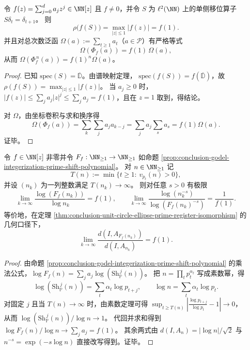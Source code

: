 \begin{proposition}[谱半径与总次数放大因子]\label{prop:conclusion-polynomial-algorithm-spectral-radius-mass}
令 \(f(z)=\sum_{j=0}^d a_j z^j\in\NN[z]\) 且 \(f\neq 0\)，并令 \(S\) 为 \(\ell^2(\NN)\) 上的单侧移位算子 \(S\delta_t=\delta_{t+1}\)。
则
\[
\rho\!\bigl(f(S)\bigr)=\max_{|z|\le 1}|f(z)|=f(1).
\]
并且对总次数泛函 \(\Omega(a):=\sum_{t\ge 1}a_t\)（\(a\in\mathcal P\)）有严格等式
\[
\Omega(\Phi_f(a))=f(1)\,\Omega(a),
\]
从而 \(\Omega(\Phi_f^{\,n}(a))=f(1)^n\Omega(a)\)。
\end{proposition}
\begin{proof}
已知 \(\mathrm{spec}(S)=\overline{\mathbb D}\)。由谱映射定理，
\(
\mathrm{spec}(f(S))=f(\overline{\mathbb D})
\)，故
\(
\rho(f(S))=\max_{|z|\le 1}|f(z)|
\)。
当 \(a_j\ge 0\) 时，\(|f(z)|\le \sum_j a_j|z|^j\le \sum_j a_j=f(1)\)，且在 \(z=1\) 取到，得结论。
\par
对 \(\Omega\)，由坐标卷积与求和换序得
\[
\Omega(\Phi_f(a))
=\sum_k\sum_j a_j a_{k-j}
=\sum_j a_j\sum_s a_s
=f(1)\Omega(a).
\]
证毕。
\end{proof}

\begin{proposition}[高素数端的椭圆重整化指数]\label{prop:conclusion-prime-shift-ellipse-renormalization-exponent}
令 \(f\in\NN[z]\) 非零并令 \(F_f:\NN_{\ge 1}\to\NN_{\ge 1}\) 如命题 \ref{prop:conclusion-godel-integerization-prime-shift-polynomial}。
对 \(n\in\NN_{\ge 1}\) 记
\[
T(n):=\min\{t\ge 1:\ v_{p_t}(n)>0\},
\]
并设 \((n_k)\) 为一列整数满足 \(T(n_k)\to\infty\)。
则对任意 \(s>0\) 有极限
\[
\lim_{k\to\infty}\frac{\log (F_f(n_k))}{\log n_k}=f(1),
\qquad
\lim_{k\to\infty}\frac{\log(n_k^{-s})}{\log(F_f(n_k)^{-s})}=\frac{1}{f(1)}.
\]
等价地，在定理 \ref{thm:conclusion-unit-circle-ellipse-prime-register-isomorphism} 的几何口径下，
\[
\lim_{k\to\infty}\frac{d(I,A_{F_f(n_k)})}{d(I,A_{n_k})}=f(1).
\]
\end{proposition}
\begin{proof}
由命题 \ref{prop:conclusion-godel-integerization-prime-shift-polynomial} 的乘法公式，\(\log F_f(n)=\sum_j a_j\log(\mathrm{Sh}_{\mathbb P}^{\,j}(n))\)。
把 \(n=\prod_t p_t^{\alpha_t}\) 写成素数幂，得
\[
\log(\mathrm{Sh}_{\mathbb P}^{\,j}(n))=\sum_t \alpha_t\log p_{t+j},
\qquad
\log n=\sum_t \alpha_t\log p_t.
\]
对固定 \(j\) 且当 \(T(n)\to\infty\) 时，由素数定理可得
\(
\sup_{t\ge T(n)}\left|\frac{\log p_{t+j}}{\log p_t}-1\right|\to 0
\)，从而
\(
\log(\mathrm{Sh}_{\mathbb P}^{\,j}(n))/\log n\to 1
\)。
代回并求和得到
\(
\log F_f(n)/\log n\to \sum_j a_j=f(1)
\)。
其余两式由 \(d(I,A_n)=|\log n|/\sqrt2\) 与 \(n^{-s}=\exp(-s\log n)\) 直接改写得到。证毕。
\end{proof}

\endinput
